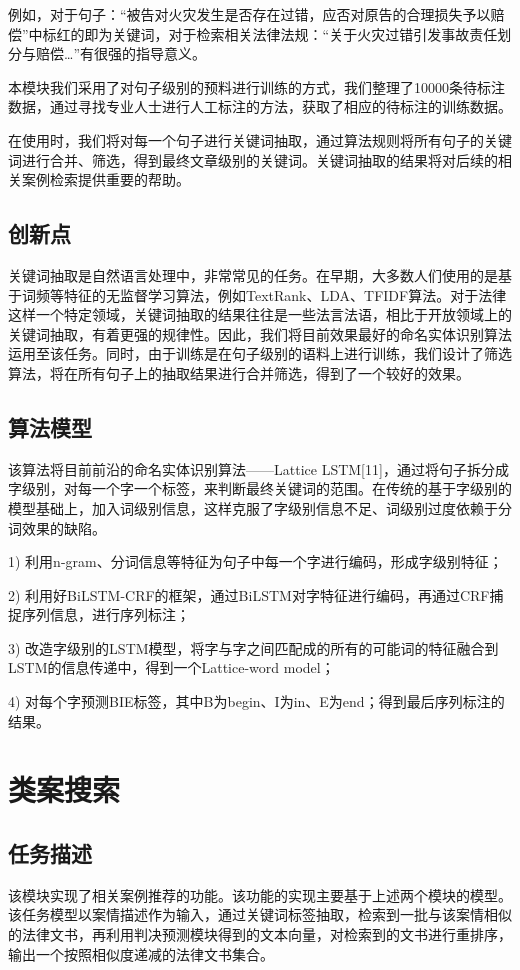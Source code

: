 例如，对于句子：“被告对{\color{red}火灾}发生是否存在{\color{red}过错}，应否对原告的合理损失予以{\color{red}赔偿}”中标红的即为关键词，对于检索相关法律法规：“关于{\color{red}火灾过错}引发事故责任划分与{\color{red}赔偿}…”有很强的指导意义。

本模块我们采用了对句子级别的预料进行训练的方式，我们整理了10000条待标注数据，通过寻找专业人士进行人工标注的方法，获取了相应的待标注的训练数据。

在使用时，我们将对每一个句子进行关键词抽取，通过算法规则将所有句子的关键词进行合并、筛选，得到最终文章级别的关键词。关键词抽取的结果将对后续的相关案例检索提供重要的帮助。

\subsection{创新点}

关键词抽取是自然语言处理中，非常常见的任务。在早期，大多数人们使用的是基于词频等特征的无监督学习算法，例如TextRank、LDA、TFIDF算法。对于法律这样一个特定领域，关键词抽取的结果往往是一些法言法语，相比于开放领域上的关键词抽取，有着更强的规律性。因此，我们将目前效果最好的命名实体识别算法运用至该任务。同时，由于训练是在句子级别的语料上进行训练，我们设计了筛选算法，将在所有句子上的抽取结果进行合并筛选，得到了一个较好的效果。

\subsection{算法模型}

该算法将目前前沿的命名实体识别算法——Lattice LSTM[11]，通过将句子拆分成字级别，对每一个字一个标签，来判断最终关键词的范围。在传统的基于字级别的模型基础上，加入词级别信息，这样克服了字级别信息不足、词级别过度依赖于分词效果的缺陷。

1)	利用n-gram、分词信息等特征为句子中每一个字进行编码，形成字级别特征；

2)	利用好BiLSTM-CRF的框架，通过BiLSTM对字特征进行编码，再通过CRF捕捉序列信息，进行序列标注；

3)	改造字级别的LSTM模型，将字与字之间匹配成的所有的可能词的特征融合到LSTM的信息传递中，得到一个Lattice-word model；

4)	对每个字预测BIE标签，其中B为begin、I为in、E为end；得到最后序列标注的结果。



\section{类案搜索}
\subsection{任务描述}
该模块实现了相关案例推荐的功能。该功能的实现主要基于上述两个模块的模型。该任务模型以案情描述作为输入，通过关键词标签抽取，检索到一批与该案情相似的法律文书，再利用判决预测模块得到的文本向量，对检索到的文书进行重排序，输出一个按照相似度递减的法律文书集合。

